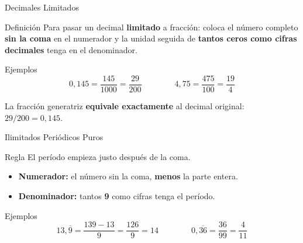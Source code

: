 \documentclass[aspectratio=169]{beamer}
\begin{document}
\begin{frame}{Decimales Limitados}
  \begin{block}{Definición}
    Para pasar un decimal \textbf{limitado} a fracción: coloca el
    número completo \textbf{sin la coma} en el numerador y la unidad
    seguida de \textbf{tantos ceros como cifras decimales} tenga en el
    denominador.
  \end{block}
  \vspace{4pt}
  \begin{exampleblock}{Ejemplos}
    \[
      0{,}145 = \frac{145}{1000} = \frac{29}{200}
      \qquad\qquad
      4{,}75 = \frac{475}{100} = \frac{19}{4}
    \]
  \end{exampleblock}
  \vspace{4pt}
  \begin{mwpasos}[Clave]
    La fracción generatriz \textbf{equivale exactamente} al decimal
    original: $29/200 = 0{,}145$.
  \end{mwpasos}
\end{frame}

\begin{frame}{Ilimitados Periódicos Puros}
  \begin{block}{Regla}
    El período empieza justo después de la coma.
    \begin{itemize}
      \item \textbf{Numerador:} el número sin la coma, \textbf{menos}
            la parte entera.
      \item \textbf{Denominador:} tantos \textbf{9} como cifras tenga
            el período.
    \end{itemize}
  \end{block}
  \vspace{4pt}
  \begin{exampleblock}{Ejemplos}
    \[
      13{,}\overline{9} = \frac{139 - 13}{9} = \frac{126}{9} = 14
      \qquad\qquad
      0{,}\overline{36} = \frac{36}{99} = \frac{4}{11}
    \]
  \end{exampleblock}
\end{frame}
\end{document}
